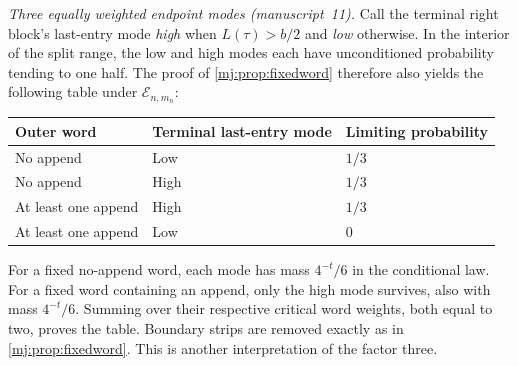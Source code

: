 \documentclass[11pt,a4paper]{article}
\theoremstyle{definition}\newaliascnt{definition}{theorem}
\theoremstyle{remark}\newaliascnt{remark}{theorem}
\begin{document}
\emph{Three equally weighted endpoint modes (manuscript~11).} Call the
terminal right block's last-entry mode \emph{high} when $L(\tau)>b/2$ and
\emph{low} otherwise. In the interior of the split range, the low and high
modes each have unconditioned probability tending to one half. The proof of
\cref{mj:prop:fixedword} therefore also yields the following table under
$\mathcal E_{n,m_n}$:
\begin{center}
\begin{tabular}{lll}
\toprule
Outer word & Terminal last-entry mode & Limiting probability\\
\midrule
No append & Low & $1/3$\\
No append & High & $1/3$\\
At least one append & High & $1/3$\\
At least one append & Low & $0$\\
\bottomrule
\end{tabular}
\end{center}
For a fixed no-append word, each mode has mass $4^{-t}/6$ in the conditional
law. For a fixed word containing an append, only the high mode survives, also
with mass $4^{-t}/6$. Summing over their respective critical word weights,
both equal to two, proves the table. Boundary strips are removed exactly as
in \cref{mj:prop:fixedword}. This is another interpretation of the factor
three.
\end{document}
